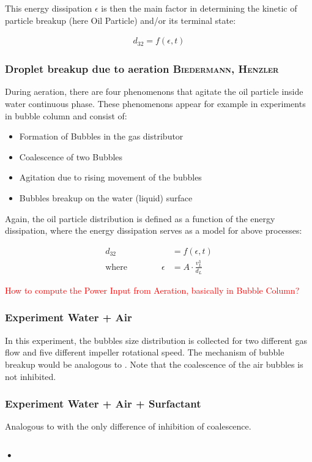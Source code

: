 This energy dissipation $\epsilon$ is then the main factor in determining the kinetic of particle breakup (here Oil Particle) and/or its terminal state:

\begin{align}
	d_{32} = f(\epsilon, t)
\end{align}



\subsubsection{Droplet breakup due to aeration \textsc{Biedermann, Henzler}}
During aeration, there are four phenomenons that agitate the oil particle inside water continuous phase. These phenomenons appear for example in experiments in bubble column and consist of:
\begin{itemize}
	\item Formation of Bubbles in the gas distributor
	\item Coalescence of two Bubbles
	\item Agitation due to rising movement of the bubbles
	\item Bubbles breakup on the water (liquid) surface
\end{itemize}

Again, the oil particle distribution is defined as a function of the energy dissipation, where the energy dissipation serves as a model for above processes:

\begin{align}
	d_{32} &= f(\epsilon, t) \\
	\text{where} \qquad \qquad \epsilon &= A \cdot \frac{v_L^3}{d_L}
\end{align}

\textcolor{red}{How to compute the Power Input from Aeration, basically in Bubble Column?}

\subsubsection{Experiment Water + Air} \label{sec:expWaterAir}
In this experiment, the bubbles size distribution is collected for two different gas flow and five different impeller rotational speed. The mechanism of bubble breakup would be analogous to . Note that the coalescence of the air bubbles is not inhibited.

\subsubsection{Experiment Water + Air + Surfactant}
Analogous to  with the only difference of inhibition of coalescence.

\subsubsection{•}